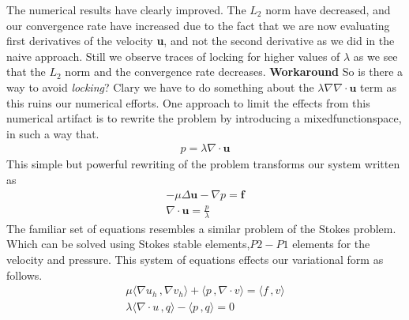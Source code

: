 \documentclass[a4paper,norsk]{article}
\begin{document}
The numerical results have clearly improved. The $L_2$ norm have decreased, and our convergence rate have increased due 
to the fact that we are now evaluating first derivatives of the velocity \textbf{u}, and not the second derivative
as we did in the naive approach. Still we observe traces of locking for higher values of $\lambda$ as we see that the $L_2$
norm and the convergence rate decreases.
\newpage
\textbf{Workaround} \newline
So is there a way to avoid \textit{locking}? Clary we have to do something about the $\lambda \nabla \nabla \cdot \textbf{u}$ term as this ruins our numerical efforts.
One approach to limit the effects from this numerical artifact is to rewrite
the problem by introducing a mixedfunctionspace, in such a way that.
\begin{align*}
p =  \lambda \nabla \cdot \textbf{u} 
\end{align*}
This simple but powerful rewriting of the problem transforms our system written as
\begin{align*}
-\mu \Delta \textbf{u} - \nabla p = \textbf{f} \\
\nabla \cdot \textbf{u} = \frac{p}{\lambda}
\end{align*}
The familiar set of equations resembles a similar problem of the Stokes problem. Which 
can be solved using Stokes stable elements,$P2-P1$ elements for the velocity and
pressure. This system of equations effects our variational form as follows.
\begin{align*}
\mu \langle \nabla u_h \,, \nabla v_h \rangle + \langle p \,, \nabla \cdot v \rangle = \langle f \,, v \rangle \\
\lambda \langle \nabla \cdot u \,, q \rangle - \langle p \,, q \rangle = 0
\end{align*}
 
\end{document}
